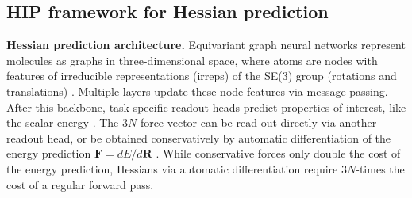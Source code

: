 \documentclass[pdflatex,sn-mathphys-num]{sn-jnl}%
\theoremstyle{thmstyleone}%
\theoremstyle{thmstyletwo}%
\theoremstyle{thmstylethree}%
\begin{document}
\subsection{HIP framework for Hessian prediction}

\textbf{Hessian prediction architecture.} 
Equivariant graph neural networks represent molecules as graphs in three-dimensional space, where atoms are nodes with features of irreducible representations (irreps) of the SE(3) group (rotations and translations) \cite{schutt2018, duvalHitchhikerGuideGeometric2024a}. 
Multiple layers update these node features via message passing. After this backbone, task-specific readout heads predict properties of interest, like the scalar energy \cite{duvenaud2015convolutional}.
The $3N$ force vector can be read out directly via another readout head, or be obtained conservatively by automatic differentiation of the energy prediction $\mathbf{F}=dE/d\mathbf{R}$ \cite{bigiDarkSideForces2025}.
While conservative forces only double the cost of the energy prediction, Hessians via automatic differentiation require $3N$-times the cost of a regular forward pass.\\
\end{document}
